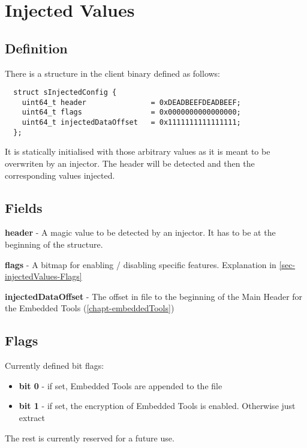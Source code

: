 \chapter{Injected Values}
\label{chapt-injectedValues}

\section{Definition}

There is a structure in the client binary defined as follows:

\begin{lstlisting}
  struct sInjectedConfig {
    uint64_t header               = 0xDEADBEEFDEADBEEF;
    uint64_t flags                = 0x0000000000000000;
    uint64_t injectedDataOffset   = 0x1111111111111111;
  };
\end{lstlisting}

It is statically initialised with those arbitrary values as it is meant to be overwriten by an injector. The header will be detected and then the corresponding values injected.

\section{Fields}

\textbf{header} - A magic value to be detected by an injector. It has to be at the beginning of the structure.

\textbf{flags} - A bitmap for enabling / disabling specific features. Explanation in \autoref{sec-injectedValues-Flags}

\textbf{injectedDataOffset} - The offset in file to the beginning of the Main Header for the Embedded Tools (\autoref{chapt-embeddedTools})

\section{Flags}
\label{sec-injectedValues-Flags}
Currently defined bit flags:
\begin{itemize}
  \item \textbf{bit 0} - if set, Embedded Tools are appended to the file
  \item \textbf{bit 1} - if set, the encryption of Embedded Tools is enabled. Otherwise just extract
\end{itemize}

The rest is currently reserved for a future use.
